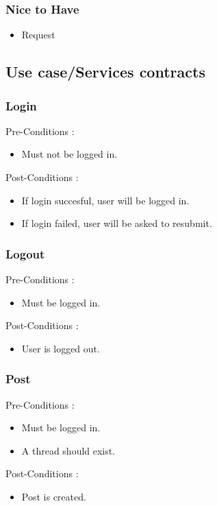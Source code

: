 \documentclass[12pt, oneside]{article}
\begin{document}
		\subsubsection{Nice to Have}
			\begin{itemize}
				\item Request
			 \end{itemize}
	\subsection{Use case/Services contracts}
			\subsubsection{Login}
				Pre-Conditions : \begin{itemize}
							\item Must not be logged in.
						     \end{itemize}
				Post-Conditions : \begin{itemize}
							\item If login succesful, user will be logged in.
							\item If login failed, user will be asked to resubmit.
						     \end{itemize}
			\subsubsection{Logout}
				Pre-Conditions : \begin{itemize}
							\item Must be logged in.
						     \end{itemize}
				Post-Conditions : \begin{itemize}
							\item User is logged out.
						     \end{itemize}
			\subsubsection{Post}
				Pre-Conditions : \begin{itemize}
							\item Must be logged in.
							\item A thread should exist.
						     \end{itemize}
				Post-Conditions : \begin{itemize}
							\item Post is created.
						     \end{itemize}
\end{document}
